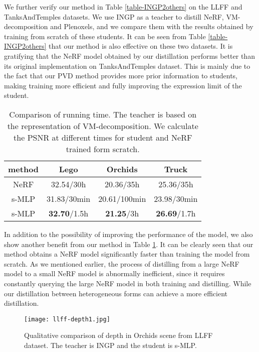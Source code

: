 \documentclass[letterpaper]{article} \usepackage{aaai23}  \usepackage{times}  \usepackage{helvet}  \usepackage{courier}  \usepackage[hyphens]{url}  \usepackage{graphicx} \urlstyle{rm} \def\UrlFont{\rm}  \usepackage{natbib}  \usepackage{caption} \frenchspacing  \setlength{\pdfpagewidth}{8.5in}  \setlength{\pdfpageheight}{11in}  \usepackage{multirow}
\begin{document}
We further verify our method in Table \ref{table-INGP2others} on the LLFF and TanksAndTemples datasets. We use INGP as a teacher to distill NeRF, VM-decomposition and Plenoxels, and we compare them with the results obtained by training from scratch of these students. It can be seen from Table \ref{table-INGP2others} that our method is also effective on these two datasets. It is gratifying that the NeRF model obtained by our distillation performs better than its original implementation on TanksAndTemples dataset. This is mainly due to the fact that our PVD method provides more prior information to students, making training more efficient and fully improving the expression limit of the student.
\begin{table}[ht]
\begin{tabular}{cccc}
\hline
method & Lego                 & Orchids               & Truck                \\ \hline
NeRF   & 32.54/30h            & 20.36/35h             & 25.36/35h            \\
s-MLP  & 31.83/30min          & 20.61/100min          & 23.98/30min          \\
s-MLP  & \textbf{32.70}/1.5h & \textbf{21.25}/3h & \textbf{26.69}/1.7h \\ \hline
\end{tabular}
\caption{Comparison of running time. The teacher is based on the representation of VM-decomposition. We calculate the PSNR at different times for student and NeRF trained form scratch.}
\label{table-time}
\end{table}
 In addition to the possibility of improving the performance of the model, we also show another benefit from our method in Table \ref{table-time}. It can be clearly seen that our method obtains a NeRF model significantly faster than training the model from scratch. As we mentioned earlier, the process of distilling from a large NeRF model to a small NeRF model is abnormally inefficient, since it requires constantly querying the large NeRF model in both training and distilling. While our distillation between heterogeneous forms can achieve a more efficient distillation.



\begin{figure}[ht]
\centering
\texttt{[image: llff-depth1.jpg]} \caption{Qualitative comparison of depth in Orchids scene from LLFF dataset. The teacher is INGP and the student is s-MLP.}
\label{fig-llff-depth}
\end{figure}
\end{document}
